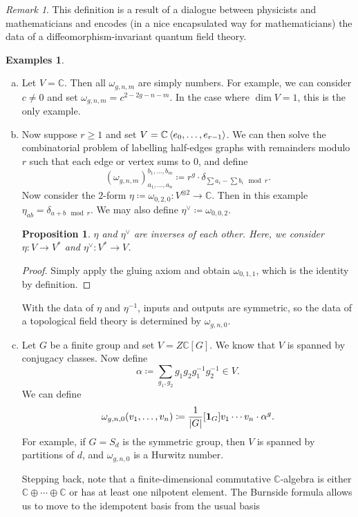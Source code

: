 \documentclass[leqno, openany]{memoir}
\newtheorem{prop}[thm]{Proposition}
\theoremstyle{definition}
\newtheorem{exms}[thm]{Examples}
\theoremstyle{remark}
\newtheorem{rmk}[thm]{Remark}
\theoremstyle{plain}
\theoremstyle{definition}
\theoremstyle{remark}
\newcommand{\C}{\mathbb{C}}
\begin{document}
\begin{rmk}
This definition is a result of a dialogue between physicists and mathematicians and encodes (in a nice encapsulated way for mathematicians) the data of a diffeomorphism-invariant quantum field theory.
\end{rmk}

\begin{exms}\leavevmode
\begin{enumerate}[(a)]
\item Let $V = \C$. Then all $\omega_{g,n,m}$ are simply numbers. For example, we can consider $c \neq 0$ and set $\omega_{g,n,m} = c^{2-2g-n-m}$. In the case where $\dim V = 1$, this is the only example.
\item Now suppose $r \geq 1$ and set $V = \C \ev{e_0, \ldots, e_{r-1}}$. We can then solve the combinatorial problem of labelling half-edges graphs with remainders modulo $r$ such that each edge or vertex sums to $0$, and define
  \[ (\omega_{g,n,m})^{b_1,\ldots, b_m}_{a_1,\ldots,a_n} \coloneqq r^g \cdot \delta_{\sum a_i - \sum b_i \mod r}. \]
  Now consider the $2$-form $\eta \coloneqq \omega_{0,2,0} \colon V^{\otimes 2} \to \C$. Then in this example $\eta_{ab} = \delta_{a+b \mod r}$. We may also define $\eta^{\vee} \coloneqq \omega_{0,0,2}$.

\begin{prop}
$\eta$ and $\eta^{\vee}$ are inverses of each other. Here, we consider $\eta \colon V \to V^*$ and $\eta^{\vee} \colon V^* \to V$.
\end{prop}

\begin{proof}
Simply apply the gluing axiom and obtain $\omega_{0,1,1}$, which is the identity by definition.
\end{proof}

With the data of $\eta$ and $\eta^{-1}$, inputs and outputs are symmetric, so the data of a topological field theory is determined by $\omega_{g,n,0}$.

\item Let $G$ be a finite group and set $V = Z \C[G]$. We know that $V$ is spanned by conjugacy classes. Now define
  \[ \alpha \coloneqq \sum_{g_1,g_2} g_1 g_2 g_1^{-1} g_2^{-1} \in V. \]
  We can define
  \[ \omega_{g,n,0}(v_1, \ldots, v_n) \coloneqq \frac{1}{\abs{G}} [\mathbf{1}_G] v_1 \cdots v_n \cdot \alpha^g. \]
  For example, if $G = S_d$ is the symmetric group, then $V$ is spanned by partitions of $d$, and $\omega_{g,n,0}$ is a Hurwitz number.

Stepping back, note that a finite-dimensional commutative $\C$-algebra is either $\C \oplus \cdots \oplus \C$ or has at least one nilpotent element. The Burnside formula allows us to move to the idempotent basis from the usual basis 
\end{enumerate}
\end{exms}
\end{document}
